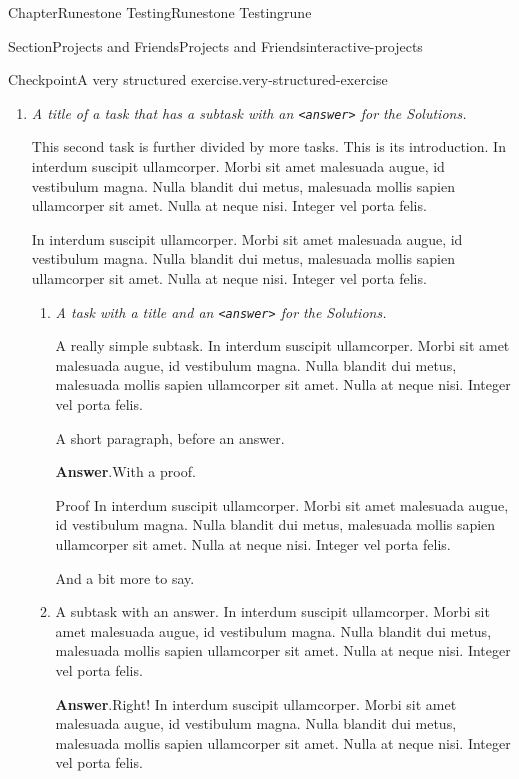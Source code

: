 \documentclass[oneside,10pt,]{book}
\newcommand{\blocktitlefont}{\relax}
\newcommand{\mono}[1]{\texttt{#1}}
\newcommand{\lititle}[1]{{\slshape#1}}
\numberwithin{equation}{section}
\begin{document}
\begin{chapterptx}{Chapter}{Runestone Testing}{}{Runestone Testing}{}{}{rune}
\begin{sectionptx}{Section}{Projects and Friends}{}{Projects and Friends}{}{}{interactive-projects}
\begin{inlineexercise}{Checkpoint}{A very structured exercise.}{very-structured-exercise}
\begin{enumerate}[font=\bfseries,label=(\alph*),ref=\alph*]
In interdum suscipit ullamcorper. Morbi sit amet malesuada augue, id vestibulum magna. Nulla blandit dui metus, malesuada mollis sapien ullamcorper sit amet. Nulla at neque nisi. Integer vel porta felis.%
\item{}\lititle{A title of a task that has a subtask with an \mono{<answer>} for the Solutions.}\par%
This second task is further divided by more tasks.  This is its introduction.  In interdum suscipit ullamcorper. Morbi sit amet malesuada augue, id vestibulum magna. Nulla blandit dui metus, malesuada mollis sapien ullamcorper sit amet. Nulla at neque nisi. Integer vel porta felis.%
\par
In interdum suscipit ullamcorper. Morbi sit amet malesuada augue, id vestibulum magna. Nulla blandit dui metus, malesuada mollis sapien ullamcorper sit amet. Nulla at neque nisi. Integer vel porta felis.%
\begin{enumerate}[font=\bfseries,label=(\roman*),ref=\theenumi.\roman*]%
\item{}\lititle{A task with a title and an \mono{<answer>} for the Solutions.}\par%
A really simple subtask.  In interdum suscipit ullamcorper. Morbi sit amet malesuada augue, id vestibulum magna. Nulla blandit dui metus, malesuada mollis sapien ullamcorper sit amet. Nulla at neque nisi. Integer vel porta felis.%
\par
A short paragraph, before an answer.%
\par\smallskip%
\noindent\textbf{\blocktitlefont Answer}.\hypertarget{very-structured-exercise-5-3-3}{}\quad{}With a proof.%
\begin{solutionproof}{Proof}
In interdum suscipit ullamcorper. Morbi sit amet malesuada augue, id vestibulum magna. Nulla blandit dui metus, malesuada mollis sapien ullamcorper sit amet. Nulla at neque nisi. Integer vel porta felis.%
\end{solutionproof}
And a bit more to say.%
\item{}A subtask with an answer.  In interdum suscipit ullamcorper. Morbi sit amet malesuada augue, id vestibulum magna. Nulla blandit dui metus, malesuada mollis sapien ullamcorper sit amet. Nulla at neque nisi. Integer vel porta felis.%
\par\smallskip%
\noindent\textbf{\blocktitlefont Answer}.\hypertarget{very-structured-exercise-5-4-2}{}\quad{}Right!  In interdum suscipit ullamcorper. Morbi sit amet malesuada augue, id vestibulum magna. Nulla blandit dui metus, malesuada mollis sapien ullamcorper sit amet. Nulla at neque nisi. Integer vel porta felis.%

\end{enumerate}
\end{enumerate}
\end{inlineexercise}
\end{sectionptx}
\end{chapterptx}
\end{document}
